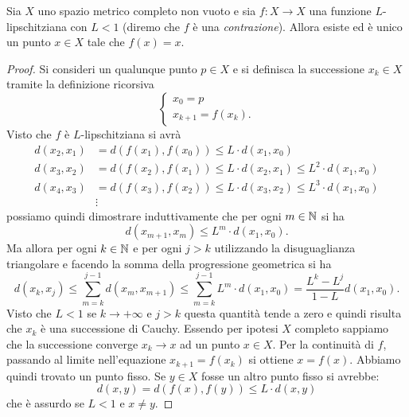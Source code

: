 \begin{theorem}
\mymark{***}%
%
%
%
%
%
%
%
\label{th:banach-caccioppoli}%
Sia $X$ uno spazio metrico completo non vuoto e sia $f\colon X \to X$ una funzione $L$-lipschitziana con $L<1$ (diremo che $f$ è una \emph{contrazione}).
Allora esiste ed è unico un punto
$x\in X$ tale che $f(x) = x$.
\end{theorem}
%
\begin{proof}
\mymark{***}
Si consideri un qualunque punto $p \in X$ e si definisca
la successione $x_k\in X$ tramite la definizione ricorsiva
\[
\begin{cases}
  x_0 = p \\
  x_{k+1} = f(x_k).
\end{cases}
\]
Visto che $f$ è $L$-lipschitziana si avrà
\begin{align*}
  d(x_2, x_1) &= d(f(x_1),f(x_0)) \le L \cdot d(x_1,x_0) \\
  d(x_3, x_2) &= d(f(x_2),f(x_1)) \le L \cdot d(x_2,x_1)
  \le L^2 \cdot d(x_1, x_0) \\
  d(x_4, x_3) &= d(f(x_3),f(x_2)) \le L \cdot d(x_3,x_2)
  \le L^3 \cdot d(x_1, x_0) \\
  &\vdots
\end{align*}
possiamo quindi dimostrare induttivamente che
per ogni $m\in {\mathbb N}$ si ha
\[
  d(x_{m+1}, x_m) \le L^m \cdot d(x_1, x_0).
\]
Ma allora per ogni $k\in {\mathbb N}$ e per ogni $j>k$
utilizzando la disuguaglianza triangolare e facendo la somma della progressione geometrica
si ha
\[
  d(x_k,x_j) \le \sum_{m=k}^{j-1} d(x_m, x_{m+1})
   \le \sum_{m=k}^{j-1} L^m \cdot d(x_1, x_0)
   = \frac{L^k-L^j}{1-L} d(x_1,x_0).
\]
Visto che $L<1$ se $k\to +\infty$ e $j>k$ questa quantità tende a zero e quindi
risulta che $x_k$ è una successione di Cauchy. Essendo per ipotesi $X$ completo sappiamo che la successione converge $x_k \to x$ ad un punto $x\in X$.
Per la continuità di $f$, passando al limite nell'equazione
$x_{k+1} = f(x_k)$ si ottiene $x = f(x)$.
Abbiamo quindi trovato un punto fisso.
Se $y\in X$ fosse un altro punto fisso si avrebbe:
\[
  d(x,y) = d(f(x),f(y)) \le L \cdot d(x,y)
\]
che è assurdo se $L<1$ e $x\neq y$.
\end{proof}

